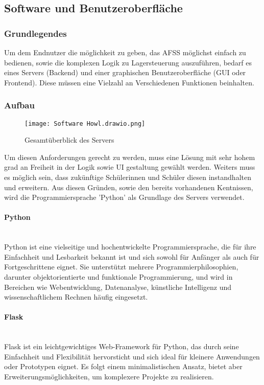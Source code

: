 \newpage
\subsection{Software und Benutzeroberfläche}

\subsubsection{Grundlegendes}

Um dem Endnutzer die möglichkeit zu geben, das AFSS möglichst einfach zu bedienen, sowie die komplexen Logik zu Lagersteuerung auszuführen, bedarf es eines Servers (Backend) und einer graphischen Benutzeroberfläche (GUI oder Frontend). Diese müssen eine Vielzahl an Verschiedenen Funktionen beinhalten.

\subsubsection{Aufbau}
\begin{figure}[h]
    \texttt{[image: Software Howl.drawio.png]}
    \caption{Gesamtüberblick des Servers}
\end{figure}

Um diesen Anforderungen gerecht zu werden, muss eine Lösung mit sehr hohem grad an Freiheit in der Logik sowie UI gestaltung gewählt werden. Weiters muss es möglich sein, dass zukünftige Schülerinnen und Schüler diesen instandhalten und erweitern. Aus diesen Gründen, sowie den bereits vorhandenen Kentnissen, wird die Programmiersprache 'Python' als Grundlage des Servers verwendet.

\paragraph{Python}\mbox{}\\
Python ist eine vielseitige und hochentwickelte Programmiersprache, die für ihre Einfachheit und Lesbarkeit bekannt ist und sich sowohl für Anfänger als auch für Fortgeschrittene eignet. Sie unterstützt mehrere Programmierphilosophien, darunter objektorientierte und funktionale Programmierung, und wird in Bereichen wie Webentwicklung, Datenanalyse, künstliche Intelligenz und wissenschaftlichem Rechnen häufig eingesetzt. \cite{chatgpt}

\paragraph{Flask}\mbox{}\\
Flask ist ein leichtgewichtiges Web-Framework für Python, das durch seine Einfachheit und Flexibilität hervorsticht und sich ideal für kleinere Anwendungen oder Prototypen eignet. Es folgt einem minimalistischen Ansatz, bietet aber Erweiterungsmöglichkeiten, um komplexere Projekte zu realisieren. \cite{chatgpt}

